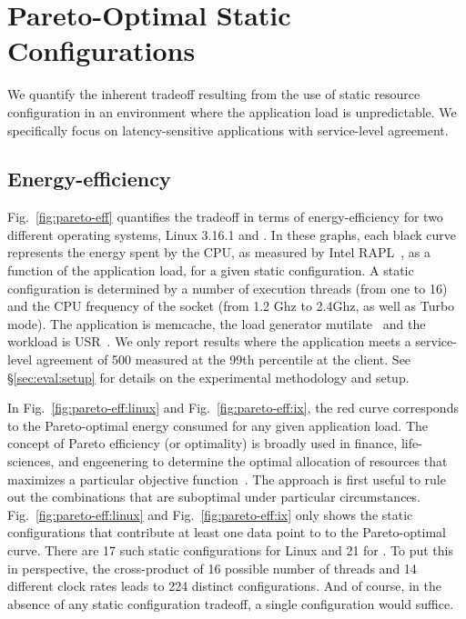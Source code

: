 
\section{Pareto-Optimal Static Configurations}
\label{sec:pareto}

We quantify the inherent tradeoff resulting from the use of static
resource configuration in an environment where the application load is
unpredictable.  We specifically focus on latency-sensitive
applications with service-level agreement. 

\subsection{Energy-efficiency}




Fig.~\ref{fig:pareto-eff} quantifies the tradeoff in terms of
energy-efficiency for two different operating systems, Linux 3.16.1
and \ix.  In these graphs, each black curve represents the energy
spent by the CPU, as measured by Intel RAPL~\cite{intel:rapl}, as a
function of the application load, for a given static configuration.  A
static configuration is determined by a number of execution threads
(from one to 16) and the CPU frequency of the socket (from 1.2 Ghz to
2.4Ghz, as well as Turbo mode).  The application is memcache, the load
generator mutilate~\cite{url:mutilate} and the workload is
USR~\cite{Atikoglu:2012:WAL}.  We only report results where the
application meets a service-level agreement of 500\microsecond
measured at the 99th percentile at the client. See
\S\ref{sec:eval:setup} for details on the experimental methodology and
setup.

In Fig.~\ref{fig:pareto-eff:linux} and Fig.~\ref{fig:pareto-eff:ix},
the red curve corresponds to the Pareto-optimal energy consumed for
any given application load.  The concept of Pareto efficiency (or
optimality) is broadly used in finance, life-sciences, and engeenering
to determine the optimal allocation of resources that maximizes a
particular objective function~\cite{wikipedia-pareto}.  The approach
is first useful to rule out the combinations that are suboptimal under
particular circumstances.  Fig.~\ref{fig:pareto-eff:linux} and
Fig.~\ref{fig:pareto-eff:ix} only shows the static configurations that
contribute at least one data point to to the Pareto-optimal curve.
There are 17 such static configurations for Linux and 21 for \ix.  To
put this in perspective, the cross-product of 16 possible number of
threads and 14 different clock rates leads to 224 distinct
configurations.  And of course, in the absence of any static
configuration tradeoff, a single configuration would suffice.

